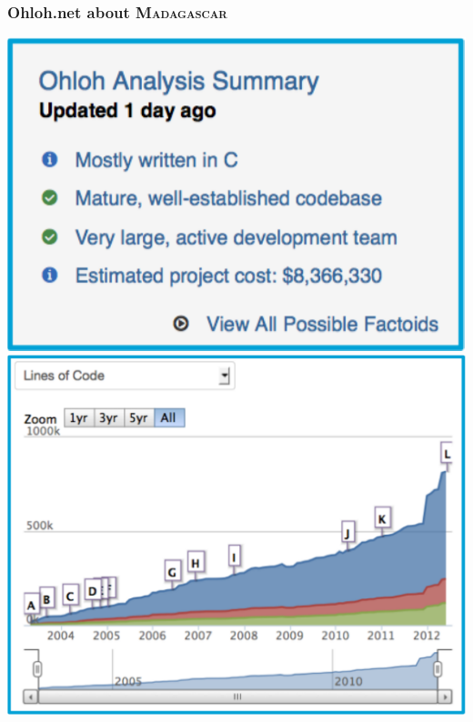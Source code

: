 \begin{frame}
\MadLogo
  \frametitle{Ohloh.net about \textsc{Madagascar}}

\begin{minipage}{0.65\textwidth}
  \includegraphics[height=0.3\textheight]{Fig/ohloh0} 
  \includegraphics[width=\textwidth]{Fig/ohloh1}
\end{minipage}
\hfill
\begin{minipage}{0.3\textwidth}

\end{minipage}
\end{frame}
